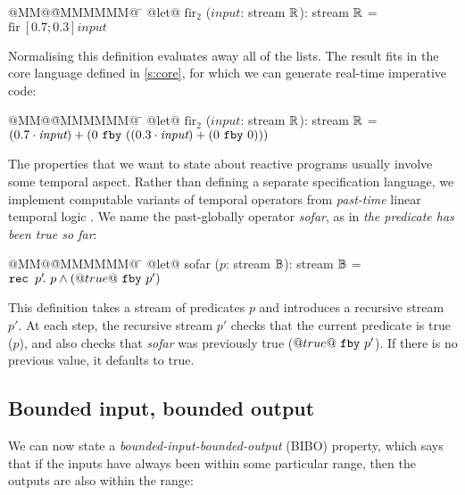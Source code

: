 \documentclass[sigplan,screen, review]{acmart}
\begin{document}
\newcommand\bibo{\mbox{bibo}}
\newcommand\fir{\mbox{fir}}
\newcommand\ii{\textit{input}}
\newcommand\oo{\textit{output}}
\newcommand\ok{\textit{ok}}
\begin{tabbing}
  @MM@\= @MMMMMM@ \= \kill
  @let@ $\mbox{fir}_2$ ($\ii$: stream $\mathbb{R}$): stream $\mathbb{R}$ = \\
    \> $\mbox{fir}~[0.7; 0.3] \ii$
\end{tabbing}

Normalising this definition evaluates away all of the lists.
The result fits in the core language defined in \autoref{s:core}, for which we can generate real-time imperative code:

\begin{tabbing}
    @MM@\= @MMMMMM@ \= \kill
      @let@ $\mbox{fir}_2$ ($\ii$: stream $\mathbb{R}$): stream $\mathbb{R}$ = \\
    \> $(0.7 \cdot \ii) + (\xfby{0}{((0.3 \cdot \ii) + (\xfby{0}{0}))})$
\end{tabbing}

The properties that we want to state about reactive programs usually involve some temporal aspect.
Rather than defining a separate specification language, we implement computable variants of temporal operators from \emph{past-time} linear temporal logic \cite{halbwachs1993executable,lichtenstein1985glory}.
We name the past-globally operator \emph{sofar}, as in \emph{the predicate has been true so far}:

\begin{tabbing}
  @MM@\= @MMMMMM@ \= \kill
  @let@ sofar ($p$: stream $\mathbb{B}$): stream $\mathbb{B}$ = \\
    \> $\texttt{rec~} p' \!.~p \wedge (@true@~\texttt{fby}~p')$
\end{tabbing}

This definition takes a stream of predicates $p$ and introduces a recursive stream $p'$.
At each step, the recursive stream $p'$ checks that the current predicate is true ($p$), and also checks that \emph{sofar} was previously true ($@true@~\texttt{fby}~p'$).
If there is no previous value, it defaults to true.

\subsection{Bounded input, bounded output}
\label{ss:tut:bibo}
We can now state a \emph{bounded-input-bounded-output} (BIBO) property, which says that if the inputs have always been within some particular range, then the outputs are also within the range:
\end{document}
